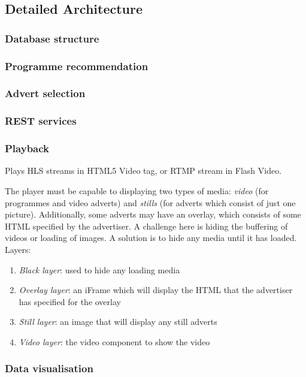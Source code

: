 \documentclass[12pt,a4paper,twoside, titlepage, openright, cleardoublepage=empty]{article}
\begin{document}
\subsection{Detailed Architecture}

\subsubsection{Database structure}

\subsubsection{Programme recommendation}

\subsubsection{Advert selection}

\subsubsection{REST services}

\subsubsection{Playback}
Plays HLS streams in HTML5 Video tag, or RTMP stream in Flash Video.

The player must be capable to displaying two types of media: \textit{video} (for programmes and video adverts) and \textit{stills} (for adverts which consist of just one picture). Additionally, some adverts may have an overlay, which consists of some HTML specified by the advertiser. A challenge here is hiding the buffering of videos or loading of images. A solution is to hide any media until it has loaded. Layers:
\begin{enumerate}
\item \textit{Black layer}: used to hide any loading media
\item \textit{Overlay layer}: an iFrame which will display the HTML that the advertiser has specified for the overlay
\item \textit{Still layer}: an image that will display any still adverts
\item \textit{Video layer}: the video component to show the video
\end{enumerate}

\subsubsection{Data visualisation}
\end{document}

